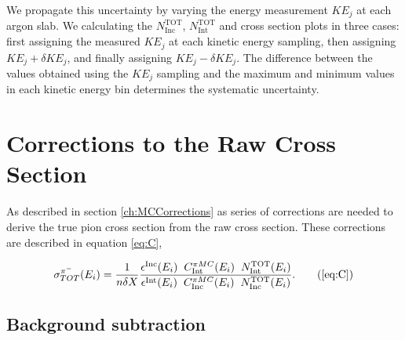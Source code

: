 We propagate this uncertainty  by varying the energy measurement $KE_{j}$ at each argon slab. We calculating the $N^{\text{TOT}}_{\text{Inc}}$,  $N^{\text{TOT}}_{\text{Int}}$ and cross section plots in three cases: first assigning the measured $KE_{j}$ at each kinetic energy sampling, then assigning $KE_{j} + \delta KE_{j}$, and finally assigning $KE_{j} - \delta KE_{j}$. The difference between the values obtained using the $KE_{j}$ sampling and the maximum and minimum values in each kinetic energy bin determines the systematic uncertainty.


\section{Corrections to the Raw Cross Section}\label{ch:PionXSCorrections}
As described in section \ref{ch:MCCorrections} as series of corrections are needed to derive the true pion cross section from the raw cross section. 
These corrections are described in equation \ref{eq:C}, 

\begin{equation}
   \sigma^{\pi^-}_{TOT}(E_{i})  = \frac{1}{n \delta X}\frac{ \epsilon^{\text{Inc}}(E_i)  \hspace{0.2cm} C^{\pi MC}_{\text{Int}} (E_{i}) \hspace{0.2cm} N^{\text{TOT}}_{\text{Int}} (E_{i}) }{   \epsilon^{\text{Int}}(E_i) \hspace{0.2cm} C^{\pi MC}_{\text{Inc}} (E_{i}) \hspace{0.2cm}  N^{\text{TOT}}_{\text{Inc}} (E_{i})}.
 \tag{\ref{eq:C}}
\end{equation}



\subsection{Background subtraction}\label{ch:BKGsubXS}

